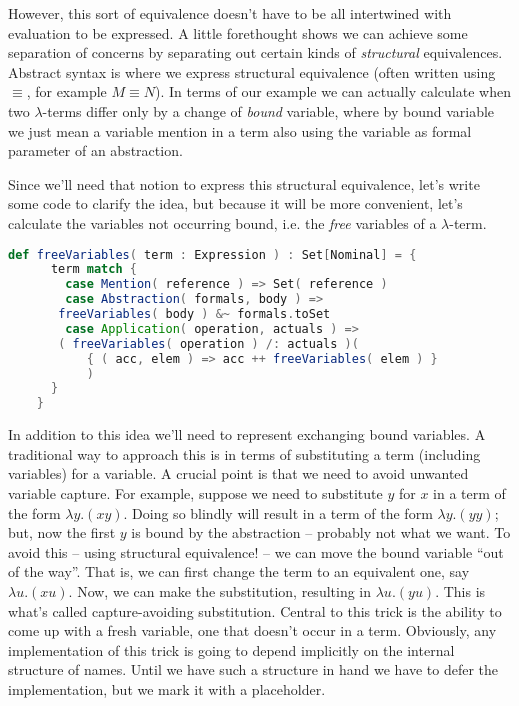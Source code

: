 However, this sort of equivalence doesn't have to be all intertwined
with evaluation to be expressed. A little forethought shows we can
achieve some separation of concerns by separating out certain kinds of
\emph{structural} equivalences. Abstract syntax is where we express
structural equivalence (often written using $\equiv$, for example $M \equiv N$).
In terms of our example we can actually calculate when two
$\lambda$-terms differ only by a change of \emph{bound} variable,
where by bound variable we just mean a variable mention in a term also
using the variable as formal parameter of an abstraction.

Since we'll need that notion to express this structural equivalence,
let's write some code to clarify the idea, but because it will be more
convenient, let's calculate the variables not occurring bound,
i.e. the \emph{free} variables of a $\lambda$-term.

\begin{lstlisting}[language=Scala]
    def freeVariables( term : Expression ) : Set[Nominal] = {
      term match {
        case Mention( reference ) => Set( reference )
        case Abstraction( formals, body ) =>
	   freeVariables( body ) &~ formals.toSet
        case Application( operation, actuals ) =>
	   ( freeVariables( operation ) /: actuals )(
           { ( acc, elem ) => acc ++ freeVariables( elem ) } 
           )
      }
    }
\end{lstlisting}

In addition to this idea we'll need to represent exchanging bound
variables. A traditional way to approach this is in terms of
substituting a term (including variables) for a variable. A crucial
point is that we need to avoid unwanted variable capture. For example,
suppose we need to substitute $y$ for $x$ in a term of the form
$\lambda y.(x y)$. Doing so blindly will result in a term of the form
$\lambda y.(y y)$; but, now the first $y$ is bound by the abstraction
-- probably not what we want. To avoid this -- using structural
equivalence! -- we can move the bound variable ``out of the
way''. That is, we can first change the term to an equivalent one, say
$\lambda u.(x u)$. Now, we can make the substitution, resulting in
$\lambda u.(y u)$. This is what's called capture-avoiding
substitution. Central to this trick is the ability to come up with a
fresh variable, one that doesn't occur in a term. Obviously, any
implementation of this trick is going to depend implicitly on the
internal structure of names. Until we have such a structure in hand we
have to defer the implementation, but we mark it with a placeholder.

